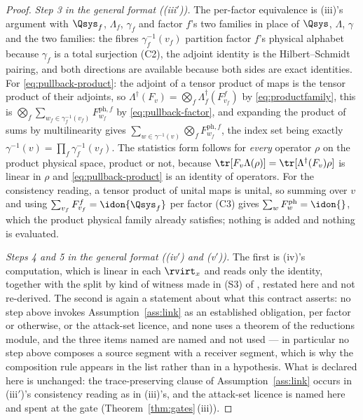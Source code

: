 \begin{proof}
\emph{Step 3 in the general format ((iii$'$)).} The per-factor equivalence is
(iii)'s argument with $\Qsys_f$, $\Lambda_f$, $\gamma_f$ and factor $f$'s two
families in place of $\Qsys$, $\Lambda$, $\gamma$ and the two families: the
fibres $\gamma_f^{-1}(v_f)$ partition factor $f$'s physical alphabet because
$\gamma_f$ is a total surjection (C2), the adjoint identity is the
Hilbert--Schmidt pairing, and both directions are available because both
sides are exact identities. For \eqref{eq:pullback-product}: the adjoint of a
tensor product of maps is the tensor product of their adjoints, so
$\Lambda^{\dagger}(F_v)=\bigotimes_f\Lambda_f^{\dagger}(F^{f}_{v_f})$ by
\eqref{eq:productfamily}, this is
$\bigotimes_f\sum_{w_f\in\gamma_f^{-1}(v_f)}F^{\mathrm{ph},f}_{w_f}$ by
\eqref{eq:pullback-factor}, and expanding the product of sums by
multilinearity gives
$\sum_{w\in\gamma^{-1}(v)}\bigotimes_fF^{\mathrm{ph},f}_{w_f}$, the index set
being exactly $\gamma^{-1}(v)=\prod_f\gamma_f^{-1}(v_f)$. The statistics form
follows for \emph{every} operator $\rho$ on the product physical space, product
or not, because $\tr[F_v\Lambda(\rho)]=\tr[\Lambda^{\dagger}(F_v)\rho]$ is
linear in $\rho$ and \eqref{eq:pullback-product} is an identity of operators.
For the consistency reading, a tensor product of unital maps is unital, so
summing over $v$ and using $\sum_{v_f}F^{f}_{v_f}=\idon{\Qsys_f}$ per factor
(C3) gives $\sum_{w}F^{\mathrm{ph}}_w=\idon{}$, which the product physical
family already satisfies; nothing is added and nothing is evaluated.

\emph{Steps 4 and 5 in the general format ((iv$'$) and (v$'$)).} The first is
(iv)'s computation, which is linear in each $\rvirt_x$ and reads only the
identity, together with the split by kind of witness made in (S3) of
, restated here and not re-derived. The second is
again a statement about what this contract asserts: no step above invokes
Assumption~\ref{ass:link} as an established obligation, per factor or
otherwise, or the attack-set licence, and none uses a theorem of the
reductions module, and the three items named are named and not used --- in particular no
step above composes a source segment with a receiver segment, which is why the
composition rule appears in the list rather than in a hypothesis. What is
declared here is unchanged: the trace-preserving clause of
Assumption~\ref{ass:link} occurs in (iii$'$)'s consistency reading as in
(iii)'s, and the attack-set licence is named here and spent at the gate
(Theorem~\ref{thm:gates}\,(iii)).
\end{proof}
